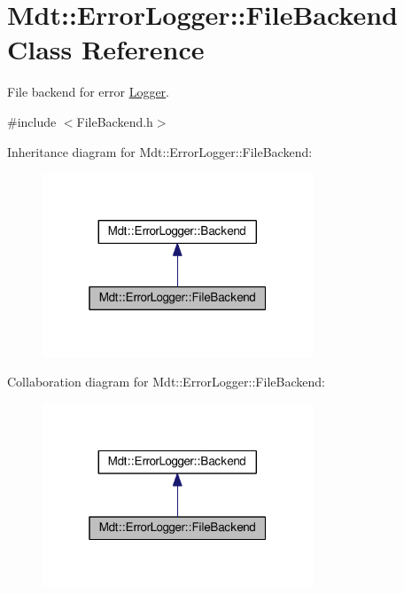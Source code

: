 \hypertarget{class_mdt_1_1_error_logger_1_1_file_backend}{}\section{Mdt\+:\+:Error\+Logger\+:\+:File\+Backend Class Reference}
\label{class_mdt_1_1_error_logger_1_1_file_backend}


File backend for error \hyperlink{class_mdt_1_1_error_logger_1_1_logger}{Logger}.  




{\ttfamily \#include $<$File\+Backend.\+h$>$}



Inheritance diagram for Mdt\+:\+:Error\+Logger\+:\+:File\+Backend\+:\nopagebreak
\begin{figure}[H]
\begin{center}
\leavevmode
\includegraphics[width=229pt]{class_mdt_1_1_error_logger_1_1_file_backend__inherit__graph}
\end{center}
\end{figure}


Collaboration diagram for Mdt\+:\+:Error\+Logger\+:\+:File\+Backend\+:\nopagebreak
\begin{figure}[H]
\begin{center}
\leavevmode
\includegraphics[width=229pt]{class_mdt_1_1_error_logger_1_1_file_backend__coll__graph}
\end{center}
\end{figure}
